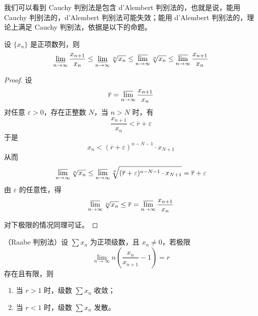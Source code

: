 我们可以看到 Cauchy 判别法是包含 d'Alembert 判别法的，也就是说，能用 Cauchy 判别法的，d'Alembert 判别法可能失效；能用 d'Alembert 判别法的，理论上满足 Cauchy 判别法，依据是以下的命题。
\begin{proposition}\label{Cauchy 判别法是包含 d'Alembert 判别法}
	设 $\{x_n\}$ 是正项数列，则
	\[
	\varliminf_{n \to \infty} \frac{x_{n+1}}{x_n} \le \varliminf_{n \to \infty} \sqrt[n]{x_n} \le \varlimsup_{n \to \infty} \sqrt[n]{x_n} \le \varlimsup_{n \to \infty} \frac{x_{n+1}}{x_n}
	\]
\end{proposition}
\begin{proof}
	设
	\[
	\overline{r} = \varlimsup_{n \to \infty} \frac{x_{n+1}}{x_n}
	\]
	对任意 $\varepsilon > 0$，存在正整数 $N$，当 $n > N$ 时，有
	\[
	\frac{x_{n+1}}{x_n} < \overline{r} + \varepsilon
	\]
	于是
	\[
	x_n < (\overline{r} + \varepsilon)^{n-N-1} \cdot x_{N+1}
	\]
	从而
	\[
	\varlimsup_{n \to \infty} \sqrt[n]{x_n} \le \varlimsup_{n \to \infty} \sqrt[n]{(\overline{r} + \varepsilon)^{n-N-1} \cdot x_{N+1}} = \overline{r} + \varepsilon
	\]
	由 $\varepsilon$ 的任意性，得
	\[
	\varlimsup_{n \to \infty} \sqrt[n]{x_n} \le \overline{r} = \varlimsup_{n \to \infty} \frac{x_{n+1}}{x_n}
	\]
	
	对下极限的情况同理可证。
	
\end{proof}
\begin{proposition}
	（Raabe 判别法）设 $\sum x_n$ 为正项级数，且 $x_n \neq 0$，若极限
	\[
	\lim_{n \to \infty} n \left( \frac{x_n}{x_{n+1}} - 1 \right) = r
	\]
	存在且有限，则
	\begin{enumerate}
		\item 当 $r > 1$ 时，级数 $\sum x_n$ 收敛；
		\item 当 $r < 1$ 时，级数 $\sum x_n$ 发散。
	\end{enumerate}
	
\end{proposition}
